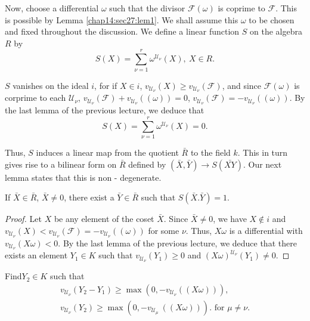 Now, choose a differential $ \omega $ such that the divisor $
\mathcal{F} ( \omega ) $ is coprime to $ \mathcal{F} $. This is
possible by Lemma \ref{chap14:sec27:lem1}. We shall assume this  $\omega$ to be chosen and
fixed throughout the discussion. We define a linear function $S$ on
the algebra $R$ by  
$$
S (X) = \sum^{r}_{\nu = 1} \omega^{\mathscr{U}_{\nu}} (X), ~ X \in R .
$$

$S$ vanishes on the ideal $i$, for if $ X \in i
$, $ v_{\mathscr{U}_{\nu}} (X) \ge v_{\mathscr{U}_{\nu}} ( \mathcal{F}
) $, and since $ \mathcal{F} ( \omega) $ is  corprime to each $
\mathscr{U}_\nu $, $ v_{\mathscr{U}_{\nu}} ( \mathcal{F}) +
v_{\mathscr{U}_{\nu}} (( \omega ))  = 0 $, $ v_{\mathscr{U}_{\nu}} (
\mathcal{F}) = -v_{\mathscr{U}_{\nu}} (( \omega )) $. By the last
lemma of the previous lecture, we deduce that   
$$
S (X) = \sum^{r}_{\nu=1} \omega^{\mathscr{U}_\nu} (X) = 0 .
$$

Thus, $S$ induces a linear map from the quotient $ \bar{R} $ to the
field $k$. This in turn gives rise to a bilinear form on $ \bar{R} $
defined by $ ( \bar{X}, \bar{Y} ) \rightarrow S ( \bar{XY} ) $. Our
next lemma states that this is non - degenerate.  

\begin{Lemma}\label{chap14:sec27:lem2}
  If $ \bar{X} \in \bar{R} $, $ \bar{X} \neq 0 $, there exist a $
  \bar{Y} \in \bar{R} $ such that $ S ( \bar{X}. \bar{Y} ) = 1 $. 
\end{Lemma}

\begin{proof}
  Let $ X $  be any element of the coset $ \bar{X} $. Since $ \bar{X}
  \neq 0 $, we have $ X \not \in i $ and $
  v_{\mathscr{U}_{\nu}} (X)  < v_{\mathscr{U}_{\nu}} ( \mathcal{F} ) =
  -v_{\mathscr{U}_{\nu}} (( \omega )) $ for some $ \nu $. Thus, $ X
  \omega $ is a differential with $ v_{\mathscr{U}_{\nu}} (X \omega )
  < 0 $. By the last lemma of the previous lecture, we deduce that
  there  exists an element $ Y_1 \in K $ such that  $
  v_{\mathscr{U}_{\nu}} (Y_1) \ge 0 $ and $ ( X \omega
  )^{\mathscr{U}_\nu} ( Y_1 ) \neq 0 $.  
\end{proof}

Find\pageoriginale $ Y_2 \in K $ such that 
\begin{gather*}
  v_{\mathscr{U}_{\nu}} ( Y_2 -Y_1 ) \ge \max ( 0, -
  v_{\mathscr{U}_{\nu}} (( X \omega ))), \\ 
  v_{\mathscr{U}_{\nu}} (Y_2 ) \ge \max ( 0, -v_{\mathscr{U}_{\mu}} ~
  (( X \omega ))). \text{ for } \mu \neq \nu .  
\end{gather*}

